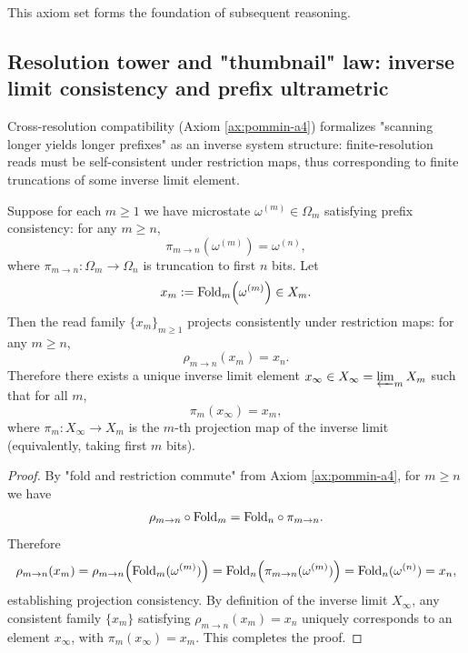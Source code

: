 This axiom set forms the foundation of subsequent reasoning.\par

\subsection{Resolution tower and "thumbnail" law: inverse limit consistency and prefix ultrametric}\label{subsec:thumbnail-inverselimit}
Cross-resolution compatibility (Axiom \ref{ax:pommin-a4}) formalizes "scanning longer yields longer prefixes" as an inverse system structure: finite-resolution reads must be self-consistent under restriction maps, thus corresponding to finite truncations of some inverse limit element.\par

\begin{theorem}\label{thm:thumbnail-inverselimit}
Suppose for each $m\ge 1$ we have microstate $\omega^{(m)}\in\Omega_m$ satisfying prefix consistency: for any $m\ge n$,
$$
\pi_{m\to n}\!\left(\omega^{(m)}\right)=\omega^{(n)},
$$
where $\pi_{m\to n}:\Omega_m\to\Omega_n$ is truncation to first $n$ bits. Let
$$
x_m:=\mathrm{Fold}_m\!\left(\omega^{(m)}\right)\in X_m.
$$
Then the read family $\{x_m\}_{m\ge 1}$ projects consistently under restriction maps: for any $m\ge n$,
$$
\rho_{m\to n}(x_m)=x_n.
$$
Therefore there exists a unique inverse limit element $x_\infty\in X_\infty=\varprojlim_m X_m$ such that for all $m$,
$$
\pi_m(x_\infty)=x_m,
$$
where $\pi_m:X_\infty\to X_m$ is the $m$-th projection map of the inverse limit (equivalently, taking first $m$ bits).\par
\end{theorem}

\begin{proof}
By "fold and restriction commute" from Axiom \ref{ax:pommin-a4}, for $m\ge n$ we have
$$
\rho_{m\to n}\circ \mathrm{Fold}_m=\mathrm{Fold}_n\circ \pi_{m\to n}.
$$
Therefore
$$
\rho_{m\to n}(x_m)
=\rho_{m\to n}\!\left(\mathrm{Fold}_m(\omega^{(m)})\right)
=\mathrm{Fold}_n\!\left(\pi_{m\to n}(\omega^{(m)})\right)
=\mathrm{Fold}_n(\omega^{(n)})
=x_n,
$$
establishing projection consistency. By definition of the inverse limit $X_\infty$, any consistent family $\{x_m\}$ satisfying $\rho_{m\to n}(x_m)=x_n$ uniquely corresponds to an element $x_\infty$, with $\pi_m(x_\infty)=x_m$. This completes the proof.\par
\end{proof}

